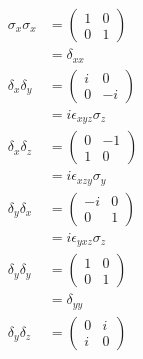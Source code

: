 \documentclass{article}
\begin{document}
\begin{enumerate}
        \begin{align*}
          \sigma_x \sigma_x & = \begin{pmatrix}
                                  1 & 0 \\
                                  0 & 1
                                \end{pmatrix}              \\
                            & = \delta_{x x}                \\
          \delta_x \delta_y & = \begin{pmatrix}
                                  i & 0  \\
                                  0 & -i
                                \end{pmatrix}              \\
                            & = i \epsilon_{x y z} \sigma_z \\
          \delta_x \delta_z & = \begin{pmatrix}
                                  0 & -1 \\
                                  1 & 0
                                \end{pmatrix}              \\
                            & = i \epsilon_{x z y} \sigma_y \\
          \delta_y \delta_x & = \begin{pmatrix}
                                  -i & 0 \\
                                  0  & 1
                                \end{pmatrix}              \\
                            & = i \epsilon_{y x z} \sigma_z \\
          \delta_y \delta_y & = \begin{pmatrix}
                                  1 & 0 \\
                                  0 & 1
                                \end{pmatrix}              \\
                            & = \delta_{y y}                \\
          \delta_y \delta_z & = \begin{pmatrix}
                                  0 & i \\
                                  i & 0
                                \end{pmatrix}              \\

\end{align*}
\end{enumerate}
\end{document}
